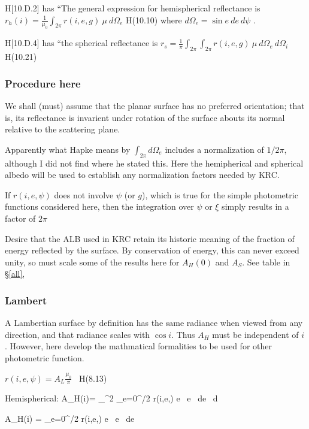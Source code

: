 H[10.D.2] has ``The general expression for hemispherical reflectance is
$r_h(i)= \frac{1}{\mu_0} \int_{2 \pi} r(i,e,g) \ \mu \ d\Omega_e $ H(10.10) 
\qi where $d\Omega_e = \sin e \ d e \ d \psi$ .

 H[10.D.4] has ``the spherical reflectance is $r_s= \frac{1}{\pi} \int_{2 \pi}  \int_{2 \pi}  r(i,e,g) \ \mu \ d\Omega_e  \ d\Omega_i $ H(10.21)

\subsubsection{Procedure here} %
We shall (must) assume that the planar surface has no preferred orientation;
that is, its reflectance is invarient under rotation of the surface abouts its
normal relative to the scattering plane.

Apparently what Hapke means by $\int_{2 \pi} d\Omega_e$ includes a normalization
of $1/2\pi$, although I did not find where he stated this.  Here the
hemipherical and spherical albedo will be used to establish any normalization
factors needed by KRC.

If $ r(i,e,\psi)$ does not involve $\psi$ (or $g$), which is true for the simple
photometric functions considered here, then the integration over $\psi$ or $\xi$
simply results in a factor of $2 \pi$

Desire that the ALB used in KRC retain its historic meaning of the fraction of
energy reflected by the surface. By conservation of energy, this can never
exceed unity, so must scale some of the results here for $A_H(0)$ and $A_S$. See
table in \S \ref{all},

\subsubsection{Lambert}
  A Lambertian surface by definition has the same radiance when viewed from any
  direction, and that radiance scales with $\cos i$. Thus $A_H$ must be
  independent of $i$. However, here develop the mathmatical formalities to be
  used for other photometric function.

$ r(i,e,\psi)=A_L \frac{\mu_0}{\pi}$ \ H(8.13)

Hemispherical:
\qbn A_H(i)=   \int_{}^{2\pi} \int_{e=0}^{\pi/2} r(i,e,\psi) \cdot \cos e \ \sin e \ de \ d\psi {}

\qbn A_H(i) =  \int_{e=0}^{\pi/2}  r(i,e,\psi) \cdot \cos e \ \sin e \ de 

